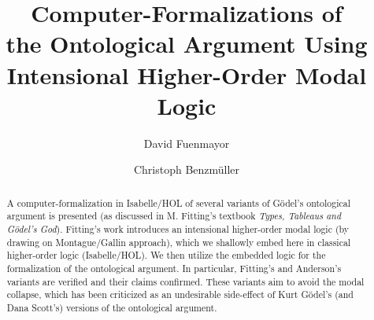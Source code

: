 \documentclass{llncs}
\begin{document}
%
\frontmatter          %
%
\pagestyle{headings}  %

%
\mainmatter              %
%
\title{Computer-Formalizations of \\
	the Ontological Argument Using\\
	Intensional Higher-Order Modal Logic}
%
\author{David Fuenmayor \and Christoph Benzm\"uller}
%

%

\maketitle              %

\begin{abstract}
	A computer-formalization in Isabelle/HOL of several variants of G\"odel's ontological argument is presented (as discussed in M. Fitting's textbook \emph{Types, Tableaus and G\"odel's God}). Fitting's work	introduces an intensional higher-order modal logic (by drawing on Montague/Gallin approach), which we shallowly embed here in classical higher-order logic (Isabelle/HOL). We then	utilize the embedded logic for the
	formalization of the ontological argument. In particular, Fitting's and Anderson's variants are verified and their claims confirmed. These variants aim to avoid the modal collapse, which has been criticized as an undesirable side-effect of Kurt G\"odel's (and Dana Scott's) versions of the ontological argument.
\end{abstract}






%




%
\end{document}
